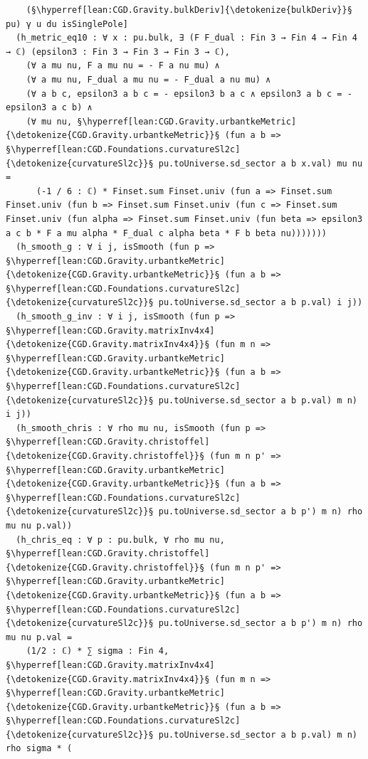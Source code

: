 \begin{verbatim}
    (§\hyperref[lean:CGD.Gravity.bulkDeriv]{\detokenize{bulkDeriv}}§ pu) γ u du isSinglePole]
  (h_metric_eq10 : ∀ x : pu.bulk, ∃ (F F_dual : Fin 3 → Fin 4 → Fin 4 → ℂ) (epsilon3 : Fin 3 → Fin 3 → Fin 3 → ℂ),
    (∀ a mu nu, F a mu nu = - F a nu mu) ∧
    (∀ a mu nu, F_dual a mu nu = - F_dual a nu mu) ∧
    (∀ a b c, epsilon3 a b c = - epsilon3 b a c ∧ epsilon3 a b c = - epsilon3 a c b) ∧
    (∀ mu nu, §\hyperref[lean:CGD.Gravity.urbantkeMetric]{\detokenize{CGD.Gravity.urbantkeMetric}}§ (fun a b => §\hyperref[lean:CGD.Foundations.curvatureSl2c]{\detokenize{curvatureSl2c}}§ pu.toUniverse.sd_sector a b x.val) mu nu =
      (-1 / 6 : ℂ) * Finset.sum Finset.univ (fun a => Finset.sum Finset.univ (fun b => Finset.sum Finset.univ (fun c => Finset.sum Finset.univ (fun alpha => Finset.sum Finset.univ (fun beta => epsilon3 a c b * F a mu alpha * F_dual c alpha beta * F b beta nu)))))))
  (h_smooth_g : ∀ i j, isSmooth (fun p => §\hyperref[lean:CGD.Gravity.urbantkeMetric]{\detokenize{CGD.Gravity.urbantkeMetric}}§ (fun a b => §\hyperref[lean:CGD.Foundations.curvatureSl2c]{\detokenize{curvatureSl2c}}§ pu.toUniverse.sd_sector a b p.val) i j))
  (h_smooth_g_inv : ∀ i j, isSmooth (fun p => §\hyperref[lean:CGD.Gravity.matrixInv4x4]{\detokenize{CGD.Gravity.matrixInv4x4}}§ (fun m n => §\hyperref[lean:CGD.Gravity.urbantkeMetric]{\detokenize{CGD.Gravity.urbantkeMetric}}§ (fun a b => §\hyperref[lean:CGD.Foundations.curvatureSl2c]{\detokenize{curvatureSl2c}}§ pu.toUniverse.sd_sector a b p.val) m n) i j))
  (h_smooth_chris : ∀ rho mu nu, isSmooth (fun p => §\hyperref[lean:CGD.Gravity.christoffel]{\detokenize{CGD.Gravity.christoffel}}§ (fun m n p' => §\hyperref[lean:CGD.Gravity.urbantkeMetric]{\detokenize{CGD.Gravity.urbantkeMetric}}§ (fun a b => §\hyperref[lean:CGD.Foundations.curvatureSl2c]{\detokenize{curvatureSl2c}}§ pu.toUniverse.sd_sector a b p') m n) rho mu nu p.val))
  (h_chris_eq : ∀ p : pu.bulk, ∀ rho mu nu, §\hyperref[lean:CGD.Gravity.christoffel]{\detokenize{CGD.Gravity.christoffel}}§ (fun m n p' => §\hyperref[lean:CGD.Gravity.urbantkeMetric]{\detokenize{CGD.Gravity.urbantkeMetric}}§ (fun a b => §\hyperref[lean:CGD.Foundations.curvatureSl2c]{\detokenize{curvatureSl2c}}§ pu.toUniverse.sd_sector a b p') m n) rho mu nu p.val =
    (1/2 : ℂ) * ∑ sigma : Fin 4, §\hyperref[lean:CGD.Gravity.matrixInv4x4]{\detokenize{CGD.Gravity.matrixInv4x4}}§ (fun m n => §\hyperref[lean:CGD.Gravity.urbantkeMetric]{\detokenize{CGD.Gravity.urbantkeMetric}}§ (fun a b => §\hyperref[lean:CGD.Foundations.curvatureSl2c]{\detokenize{curvatureSl2c}}§ pu.toUniverse.sd_sector a b p.val) m n) rho sigma * (

\end{verbatim}
